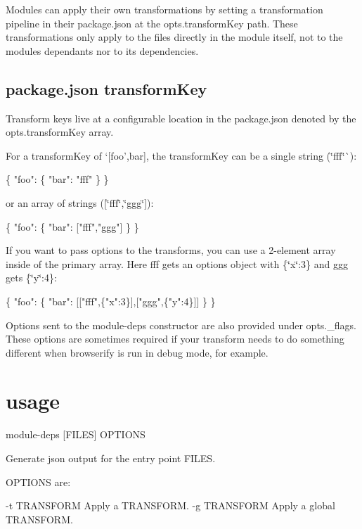 Modules can apply their own transformations by setting a transformation pipeline in their package.\+json at the {\ttfamily opts.\+transform\+Key} path. These transformations only apply to the files directly in the module itself, not to the module\textquotesingle{}s dependants nor to its dependencies.

\subsection*{package.\+json transform\+Key}

Transform keys live at a configurable location in the package.\+json denoted by the {\ttfamily opts.\+transform\+Key} array.

For a transform\+Key of `\mbox{[}\textquotesingle{}foo',\textquotesingle{}bar\textquotesingle{}\mbox{]}{\ttfamily , the transform\+Key can be a single string (}\char`\"{}fff\char`\"{}\`{})\+:


\begin{DoxyCode}
\{
  "foo": \{
    "bar": "fff"
  \}
\}
\end{DoxyCode}


or an array of strings ({\ttfamily \mbox{[}\char`\"{}fff\char`\"{},\char`\"{}ggg\char`\"{}\mbox{]}})\+:


\begin{DoxyCode}
\{
  "foo": \{
    "bar": ["fff","ggg"]
  \}
\}
\end{DoxyCode}


If you want to pass options to the transforms, you can use a 2-\/element array inside of the primary array. Here {\ttfamily fff} gets an options object with {\ttfamily \{\char`\"{}x\char`\"{}\+:3\}} and {\ttfamily ggg} gets {\ttfamily \{\char`\"{}y\char`\"{}\+:4\}}\+:


\begin{DoxyCode}
\{
  "foo": \{
    "bar": [["fff",\{"x":3\}],["ggg",\{"y":4\}]]
  \}
\}
\end{DoxyCode}


Options sent to the module-\/deps constructor are also provided under {\ttfamily opts.\+\_\+flags}. These options are sometimes required if your transform needs to do something different when browserify is run in debug mode, for example.

\section*{usage}


\begin{DoxyCode}
module-deps [FILES] OPTIONS

  Generate json output for the entry point FILES.

OPTIONS are:

  -t TRANSFORM  Apply a TRANSFORM.
  -g TRANSFORM  Apply a global TRANSFORM.
\end{DoxyCode}


